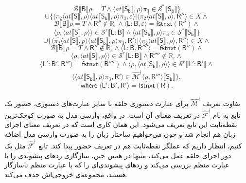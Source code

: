 $$\mathcal{B}\llbracket \mathsf{B} \rrbracket \rho = \mathit{T}\land \langle at \llbracket \mathsf{S_b} \rrbracket , \rho \rangle \pi_3 \in \mathcal{S}^* \llbracket \mathsf{S_b} \rrbracket \}$$
$$\cup\{\langle \pi_2 \langle at \llbracket \mathsf{S} \rrbracket , \rho \rangle \langle at \llbracket \mathsf{S_b} \rrbracket , \rho \rangle \pi_3 , \varepsilon \rangle | \langle \pi_2 \langle at \llbracket \mathsf{S} \rrbracket , \rho \rangle , \mathsf{R''} \rangle \in X \land$$
$$\mathcal{B} \llbracket \mathsf{B} \rrbracket \rho = \mathit{T} \land \mathsf{R''} \notin \mathbb{R_\varepsilon} \land \langle \mathsf{L:B} , \varepsilon \rangle = \mathsf{fstnxt(R'')} \land$$	
$$\langle \underline{\rho} ,\langle at \llbracket \mathsf{S} \rrbracket, \rho \rangle \rangle \in \mathcal{S}^r \llbracket \mathsf{L:B} \rrbracket \land \langle at \llbracket \mathsf{S_b} \rrbracket , \rho \rangle \pi_3 \in \mathcal{S}^* \llbracket \mathsf{S_b} \rrbracket\}$$ 
$$\cup \{ \langle \pi_2 \langle at \llbracket \mathsf{S} \rrbracket , \rho \rangle \langle at \llbracket \mathsf{S_b} \rrbracket , \rho \rangle \pi_3 , \mathsf{R'} \rangle | \langle \pi_2 \langle at \llbracket \mathsf{S} \rrbracket , \rho \rangle , \mathsf{R''} \rangle \in X \land$$
$$\mathcal{B} \llbracket \mathsf{B} \rrbracket \rho = \mathit{T} \land \mathsf{R''} \notin \mathbb{R_\varepsilon} \land \langle \mathsf{L:B,R''''} \rangle = \mathsf{fstnxt(R'')} \land$$
$$\langle \underline{\rho} , \langle at \llbracket \mathsf{S}\rrbracket , \rho \rangle \rangle \in \mathcal{S}^r \llbracket \mathsf{L:B} \rrbracket \land \mathsf{R''''} \notin \mathbb{R_\varepsilon} \land$$
$$\langle \mathsf{L':B',R'''} \rangle = \mathsf{fstnxt(R'''')} \land \langle \underline{\rho} , \langle at \llbracket \mathsf{S_b}\rrbracket , \rho \rangle \rangle \in \mathcal{S}^r \llbracket \mathsf{L':B'} \rrbracket \land$$
$$\langle \langle at \llbracket \mathsf{S_b} \rrbracket, \rho \rangle \pi_3 , \mathsf{R'} \rangle \in \mathcal{\hat{M}^\nmid} \langle \underline{\rho} , \mathsf{R'''} \rangle \llbracket \mathsf{S_b} \rrbracket \},$$
$$ \mathsf{where \; \langle L':B' , R' \rangle = fstnxt(R)}.$$

تفاوت تعریف 
$\mathcal{\hat{M}}^\nmid$
 برای عبارت‌ دستوری حلقه با سایر عبارت‌های دستوری، حضور یک تابع به نام $\mathcal{\hat{F}^\nmid}$ در تعریف معنای آن است. در واقع، وارسی مدل به صورت کوچک‌ترین نقطه‌ثابت این تابع تعریف می‌شود. این همان کاری است که در تعریف معنای اجزای زبان هم انجام شد و چون می‌خواهیم ساختار زبان را به صورت وارسی مدل اضافه کنیم، انتظار داریم که عملگر نقطه‌ثابت هم در تعریف حضور پیدا کند. تابع $\mathcal{\hat{F}^\nmid}$ مثل یک دور اجرای حلقه‌ عمل می‌کند، منتها در همین حین، سازگاری ردهای پیشوندی را با عبارت منظم بررسی می‌کند و ردهای پیشوندی‌ای را که با عبارت منظم ناسازگار هستند، مجموعه‌ی خروجی‌اش حذف می‌کند.


